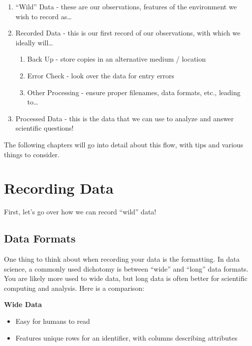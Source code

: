 \documentclass[
  letterpaper,
  DIV=11,
  numbers=noendperiod]{scrreprt}
\providecommand{\tightlist}{%
  \setlength{\itemsep}{0pt}\setlength{\parskip}{0pt}}\usepackage{longtable,booktabs,array}
\begin{document}
\begin{enumerate}
\def\labelenumi{\arabic{enumi}.}
\tightlist
\item
  ``Wild'' Data - these are our observations, features of the
  environment we wish to record as\ldots{}
\item
  Recorded Data - this is our first record of our observations, with
  which we ideally will\ldots{}

  \begin{enumerate}
  \def\labelenumii{\arabic{enumii}.}
  \tightlist
  \item
    Back Up - store copies in an alternative medium / location
  \item
    Error Check - look over the data for entry errors
  \item
    Other Processing - ensure proper filenames, data formats, etc.,
    leading to\ldots{}
  \end{enumerate}
\item
  Processed Data - this is the data that we can use to analyze and
  answer scientific questions!
\end{enumerate}

The following chapters will go into detail about this flow, with tips
and various things to consider.

\chapter{Recording Data}\label{recording-data}

First, let's go over how we can record ``wild'' data!

\section{Data Formats}\label{data-formats}

One thing to think about when recording your data is the formatting. In
data science, a commonly used dichotomy is between ``wide'' and ``long''
data formats. You are likely more used to wide data, but long data is
often better for scientific computing and analysis. Here is a
comparison:

\textbf{Wide Data}

\begin{itemize}
\item
  Easy for humans to read
\item
  Features unique rows for an identifier, with columns describing
  attributes
\end{itemize}
\end{document}
